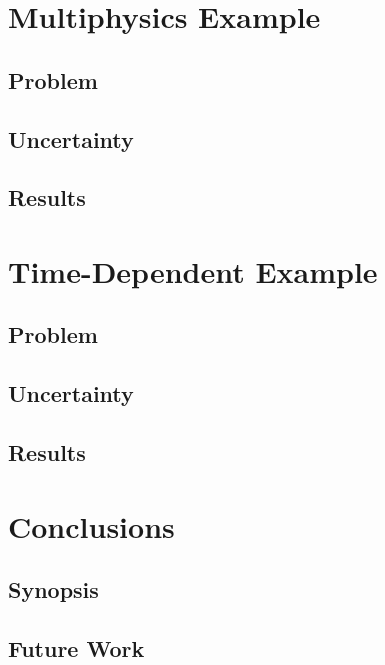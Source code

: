 \documentclass{beamer}
\begin{document}
\section{Multiphysics Example}
\subsection{Problem}
\subsection{Uncertainty}
\subsection{Results}





\section{Time-Dependent Example}
\subsection{Problem}
\subsection{Uncertainty}
\subsection{Results}






\section{Conclusions}
\subsection{Synopsis}
\subsection{Future Work}
\end{document}
